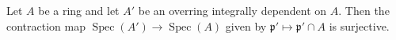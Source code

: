 Let $A$ be a ring and let $A'$ be an overring integrally dependent on $A$. Then the contraction map $\operatorname{Spec}(A') \to \operatorname{Spec}(A)$ given by $\mathfrak{p}' \mapsto \mathfrak{p}' \cap A$ is surjective.
